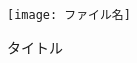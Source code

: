 \begin{figure}[htbp]
  \begin{center}
    \texttt{[image: ファイル名]}
  \end{center}
  \caption{タイトル} \label{ラベル}
\end{figure}
